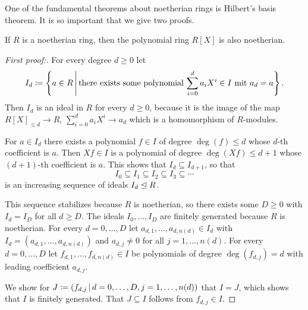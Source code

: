 \begin{fluff}
  One of the fundamental theorems about noetherian rings is Hilbert’s basis theorem.
  It is so important that we give two proofs.
\end{fluff}


\begin{theorem}
  \label{theorem: Hilberts basis theorem}
  If $R$ is a noetherian ring, then the polynomial ring $R[X]$ is also noetherian.
\end{theorem}


\begin{proof}[First proof:]
  For every degree $d \geq 0$ let
  \[
              I_d
    \defined  \left\{
                a \in R
              \suchthat*
                \text{there exists some polynomial $\sum_{i=0}^d a_i X^i \in I$ mit $a_d = a$}
              \right\}.
  \]
  Then $I_d$ is an ideal in $R$ for every $d \geq 0$, because it is the image of the map $R[X]_{\leq d} \to R$, $\sum_{i=0}^d a_i X^i \to a_d$ which is a homomorphism of $R$-modules.
  
  For $a \in I_d$ there exists a polynomial $f \in I$ of degree $\deg(f) \leq d$ whose $d$-th coefficient is $a$.
  Then $Xf \in I$ is a polynomial of degree $\deg(Xf) \leq d+1$ whose $(d+1)$-th coefficient is $a$.
  This shows that $I_d \subseteq I_{d+1}$, so that
  \[
              I_0
    \subseteq I_1
    \subseteq I_2
    \subseteq I_3
    \subseteq \dotsb
  \]
  is an increasing sequence of ideals $I_d \trianglelefteq R$.
  
  This sequence stabilizes because $R$ is noetherian, so there exists some $D \geq 0$ with $I_d = I_D$ for all $d \geq D$.
  The ideals $I_0, \dotsc, I_D$ are finitely generated because $R$ is noetherian.
  For every $d = 0, \dotsc, D$ let $a_{d,1}, \dotsc, a_{d,n(d)} \in I_d$ with $I_d = (a_{d,1}, \dotsc, a_{d,n(d)})$ and $a_{d,j} \neq 0$ for all $j = 1, \dotsc, n(d)$.
  For every $d = 0, \dotsc, D$ let $f_{d,1}, \dotsc, f_{d,n(d)} \in I$ be polynomials of degree $\deg(f_{d,j}) = d$ with leading coefficient $a_{d,j}$.
  
  We show for $J \defined (f_{d,j} \suchthat d = 0, \dotsc, D, j = 1, \dotsc, n(d))$ that $I = J$, which shows that $I$ is finitely generated.
  That $J \subseteq I$ follows from $f_{d,j} \in I$.
  

\end{proof}
